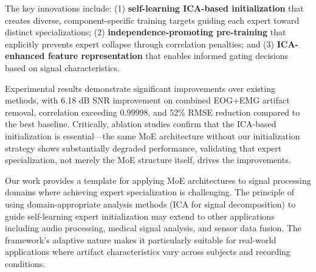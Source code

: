 \documentclass{article}
\begin{document}
The key innovations include: (1) \textbf{self-learning ICA-based initialization} that creates diverse, component-specific training targets guiding each expert toward distinct specializations; (2) \textbf{independence-promoting pre-training} that explicitly prevents expert collapse through correlation penalties; and (3) \textbf{ICA-enhanced feature representation} that enables informed gating decisions based on signal characteristics.

Experimental results demonstrate significant improvements over existing methods, with 6.18 dB SNR improvement on combined EOG+EMG artifact removal, correlation exceeding 0.99998, and 52\% RMSE reduction compared to the best baseline. Critically, ablation studies confirm that the ICA-based initialization is essential---the same MoE architecture without our initialization strategy shows substantially degraded performance, validating that expert specialization, not merely the MoE structure itself, drives the improvements.

Our work provides a template for applying MoE architectures to signal processing domains where achieving expert specialization is challenging. The principle of using domain-appropriate analysis methods (ICA for signal decomposition) to guide self-learning expert initialization may extend to other applications including audio processing, medical signal analysis, and sensor data fusion. The framework's adaptive nature makes it particularly suitable for real-world applications where artifact characteristics vary across subjects and recording conditions.




\end{document}
